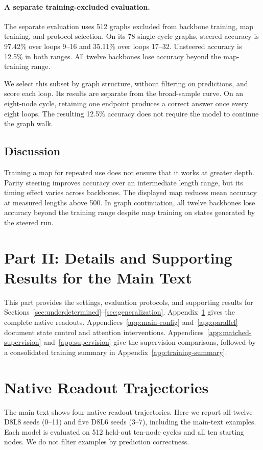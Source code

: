 \documentclass{article}
\begin{document}
\paragraph{A separate training-excluded evaluation.}
The separate evaluation uses 512 graphs excluded from backbone training, map training, and protocol selection. On its 78 single-cycle graphs, steered accuracy is 97.42\% over loops 9--16 and 35.11\% over loops 17--32. Unsteered accuracy is 12.5\% in both ranges. All twelve backbones lose accuracy beyond the map-training range.

We select this subset by graph structure, without filtering on predictions, and score each loop. Its results are separate from the broad-sample curve. On an eight-node cycle, retaining one endpoint produces a correct answer once every eight loops. The resulting 12.5\% accuracy does not require the model to continue the graph walk.

\subsection{Discussion}
Training a map for repeated use does not ensure that it works at greater depth. Parity steering improves accuracy over an intermediate length range, but its timing effect varies across backbones. The displayed map reduces mean accuracy at measured lengths above 500. In graph continuation, all twelve backbones lose accuracy beyond the training range despite map training on states generated by the steered run.

\FloatBarrier

\section*{Part II: Details and Supporting Results for the Main Text}
This part provides the settings, evaluation protocols, and supporting results for Sections~\ref{sec:underdetermined}--\ref{sec:generalization}. Appendix~\ref{app:all-native-trajectories} gives the complete native readouts. Appendices~\ref{app:main-config} and~\ref{app:parallel} document state control and attention interventions. Appendices~\ref{app:matched-supervision} and~\ref{app:supervision} give the supervision comparisons, followed by a consolidated training summary in Appendix~\ref{app:training-summary}.

\section{Native Readout Trajectories}
\label{app:all-native-trajectories}
The main text shows four native readout trajectories. Here we report all twelve D8L8 seeds (0--11) and five D8L6 seeds (3--7), including the main-text examples. Each model is evaluated on 512 held-out ten-node cycles and all ten starting nodes. We do not filter examples by prediction correctness.
\end{document}
